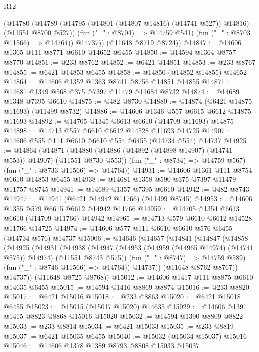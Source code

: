 \begin{lexlean}{R12}
\begin{coremodule}
{{{{{{{{{{{{{{{{{{{{{{{{{{{{{{{{{{{{{{{{{{{{{{{{{{{{{{{{{{{{{{{{{{{{{{{{{{{{{{{{{{          (@14780
            (@14789 (@14795 (@14801 (@14807 @14816) (@14741 @527)) @14816) (@11551 @8700 @527))
            (fun ("_" : @8704) => @14759 @541)
            (fun ("_" : @8703 @11566) => @14764))
          @14737))
      (@11648 @8719 @8724))
@14847 := @14606 @1365 @111 @8771 @6610 @14652 @6455
@14850 := @14594 @1364 @8757 @8770
@14851 := @233 @8762
@14852 := @6421 @14851
@14853 := @233 @8767
@14855 := @6421 @14853 @6455
@14858 := @14850 (@14852 @14855) @14652
@14864 := @14606 @1352 @1363 @8741 @8756 @14851 @14855
@14871 := @14681 @1349 @568 @375 @7397 @11479 @11684 @8732
@14874 := @14689 @1348 @7395 @6610
@14875 := @482 @8730
@14880 := @14874 (@6421 @14875 @11693) (@11499 @8732)
@14886 := @14606 @1346 @557 @6615 @6612 @14875 @11693
@14892 := @14705 @1345 @6613 @6610 (@14709 @11693) @14875
@14898 := @14713 @557 @6610 @6612 @14528 @11693 @14725
@14907 := @14606 @555 @111 @6610 @6610 @554 @6455 (@14734 @554) @14737
@14925 := @14864
    (@14871
      (@14880 (@14886 (@14892 (@14898 @14907) (@14741 @553)) @14907) (@11551 @8730 @553))
      (fun ("_" : @8734) => @14759 @567)
      (fun ("_" : @8733 @11566) => @14764))
@14931 := @14606 @1361 @111 @8754 @6610 @14853 @6455
@14938 := @14681 @1358 @590 @375 @7397 @11479 @11757 @8745
@14941 := @14689 @1357 @7395 @6610
@14942 := @482 @8743
@14947 := @14941 (@6421 @14942 @11766) (@11499 @8745)
@14953 := @14606 @1355 @579 @6615 @6612 @14942 @11766
@14959 := @14705 @1354 @6613 @6610 (@14709 @11766) @14942
@14965 := @14713 @579 @6610 @6612 @14528 @11766 @14725
@14974 := @14606 @577 @111 @6610 @6610 @576 @6455 (@14734 @576) @14737
@15006 := @14646
    (@14657
      (@14841
        (@14847
          (@14858
            (@14925
              (@14931
                (@14938
                  (@14947
                    (@14953 (@14959 (@14965 @14974) (@14741 @575)) @14974)
                    (@11551 @8743 @575))
                  (fun ("_" : @8747) => @14759 @589)
                  (fun ("_" : @8746 @11566) => @14764))
                @14737))
            (@11648 @8762 @8767))
          @14737))
      (@11648 @8725 @8768))
@15012 := @14606 @1417 @111 @8875 @6610 @14635 @6455
@15015 := @14594 @1416 @8869 @8874
@15016 := @233 @8820
@15017 := @6421 @15016
@15018 := @233 @8863
@15020 := @6421 @15018 @6455
@15023 := @15015 (@15017 @15020) @14635
@15029 := @14606 @1391 @1415 @8823 @8868 @15016 @15020
@15032 := @14594 @1390 @8809 @8822
@15033 := @233 @8814
@15034 := @6421 @15033
@15035 := @233 @8819
@15037 := @6421 @15035 @6455
@15040 := @15032 (@15034 @15037) @15016
@15046 := @14606 @1378 @1389 @8793 @8808 @15033 @15037
}}}}}}}}}}}}}}}}}}}}}}}}}}}}}}}}}}}}}}}}}}}}}}}}}}}}}}}}}}}}}}}}}}}}}}}}}}}}}}}}}}
\end{coremodule}
\end{lexlean}
